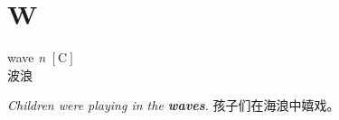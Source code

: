\section{W}

\item[] {
    \lettrine{wave}{}  
    \textit{n} 
    $\mathrm{[C]}$ 
    \\
    波浪

    \textit{Children were playing in the \textbf{waves}.}
    孩子们在海浪中嬉戏。

} 
